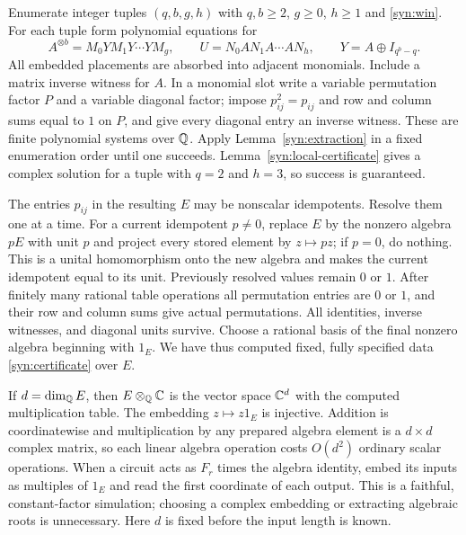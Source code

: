 Enumerate integer tuples $(q,b,g,h)$ with $q,b\ge2$, $g\ge0$, $h\ge1$ and
\eqref{syn:win}.  For each tuple form polynomial equations for
\begin{equation}\label{syn:certificate}
 A^{\otimes b}=M_0YM_1Y\cdots YM_g,
 \qquad U=N_0AN_1A\cdots AN_h,
 \qquad Y=A\oplus I_{q^b-q}.
\end{equation}
All embedded placements are absorbed into adjacent monomials.
Include a matrix inverse witness for $A$.  In a monomial slot write
a variable permutation factor $P$ and a variable diagonal factor;
impose $p_{ij}^2=p_{ij}$ and row and column sums equal to $1$ on $P$,
and give every diagonal entry an inverse witness.  These are finite
polynomial systems over $\mathbb Q$.  Apply Lemma~\ref{syn:extraction} in a
fixed enumeration order until one succeeds.  Lemma~\ref{syn:local-certificate} gives a complex solution for a tuple
with $q=2$ and $h=3$, so success is guaranteed.

The entries $p_{ij}$ in the resulting $E$ may be nonscalar idempotents.
Resolve them one at a time.  For a current idempotent $p\ne0$, replace
$E$ by the nonzero algebra $pE$ with unit $p$ and project every stored
element by $z\mapsto pz$; if $p=0$, do nothing.  This is a unital
homomorphism onto the new algebra and makes the current idempotent
equal to its unit.  Previously resolved values remain $0$ or $1$.
After finitely many rational table operations all permutation entries
are $0$ or $1$, and their row and column sums give actual permutations.
All identities, inverse witnesses, and diagonal units survive.
Choose a rational basis of the final nonzero algebra beginning with
$1_E$.  We have thus computed fixed, fully specified data
\eqref{syn:certificate} over $E$.

\begin{remark}\label{syn:simulation}
If $d=\dim_{\mathbb Q}E$, then $E\otimes_{\mathbb Q}\mathbb C$ is the vector space $\mathbb C^d$
with the computed multiplication table.  The embedding
$z\mapsto z1_E$ is injective.  Addition is coordinatewise and
multiplication by any prepared algebra element is a $d\times d$
complex matrix, so each linear algebra operation costs $O(d^2)$
ordinary scalar operations.  When a circuit acts as $F_r$ times the
algebra identity, embed its inputs as multiples of $1_E$ and read the
first coordinate of each output.  This is a faithful, constant-factor
simulation; choosing a complex embedding or extracting algebraic
roots is unnecessary.  Here $d$ is fixed before the input length is
known.
\end{remark}

